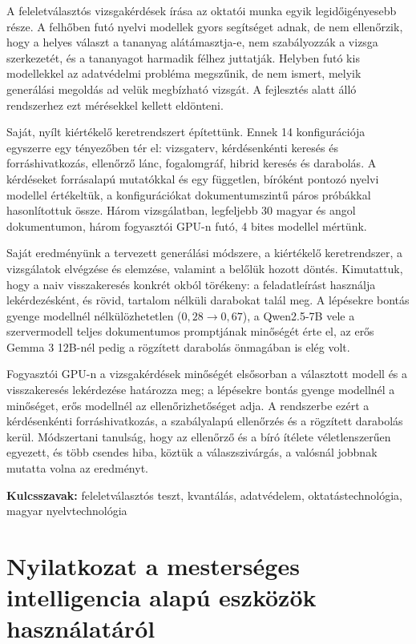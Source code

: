 \medskip
A feleletválasztós vizsgakérdések írása az oktatói munka egyik legidőigényesebb része. A felhőben futó nyelvi
modellek gyors segítséget adnak, de nem ellenőrzik, hogy a helyes választ a tananyag alátámasztja-e, nem
szabályozzák a vizsga szerkezetét, és a tananyagot harmadik félhez juttatják. Helyben futó kis modellekkel az
adatvédelmi probléma megszűnik, de nem ismert, melyik generálási megoldás ad velük megbízható vizsgát. A
fejlesztés alatt álló \Mimir{} rendszerhez ezt mérésekkel kellett eldönteni.

Saját, nyílt kiértékelő keretrendszert építettünk. Ennek 14 konfigurációja egyszerre egy tényezőben tér el:
vizsgaterv, kérdésenkénti keresés és forráshivatkozás, ellenőrző lánc, fogalomgráf, hibrid keresés és
darabolás. A kérdéseket forrásalapú mutatókkal és egy független, bíróként pontozó nyelvi modellel értékeltük,
a konfigurációkat dokumentumszintű páros próbákkal hasonlítottuk össze. Három vizsgálatban, legfeljebb 30
magyar és angol dokumentumon, három fogyasztói GPU-n futó, 4 bites modellel mértünk.

Saját eredményünk a \Mimir{} tervezett generálási módszere, a kiértékelő keretrendszer, a vizsgálatok
elvégzése és elemzése, valamint a belőlük hozott döntés. Kimutattuk, hogy a naiv visszakeresés konkrét okból
törékeny: a feladatleírást használja lekérdezésként, és rövid, tartalom nélküli darabokat talál meg. A
lépésekre bontás gyenge modellnél nélkülözhetetlen ($0{,}28\to0{,}67$), a Qwen2.5-7B vele a szervermodell
teljes dokumentumos promptjának minőségét érte el, az erős Gemma 3 12B-nél pedig a rögzített darabolás
önmagában is elég volt. 

Fogyasztói GPU-n a vizsgakérdések minőségét elsősorban a választott modell és a visszakeresés lekérdezése
határozza meg; a lépésekre bontás gyenge modellnél a minőséget, erős modellnél az ellenőrizhetőséget adja. A
rendszerbe ezért a kérdésenkénti forráshivatkozás, a szabályalapú ellenőrzés és a rögzített darabolás kerül.
Módszertani tanulság, hogy az ellenőrző és a bíró ítélete véletlenszerűen egyezett, és több csendes hiba,
köztük a válaszszivárgás, a valósnál jobbnak mutatta volna az eredményt.

\medskip
\noindent\textbf{Kulcsszavak:} feleletválasztós teszt, kvantálás, adatvédelem, oktatástechnológia, magyar
nyelvtechnológia

\chapter{Nyilatkozat a mesterséges intelligencia alapú eszközök használatáról}
\label{app-mi-nyilatkozat}

